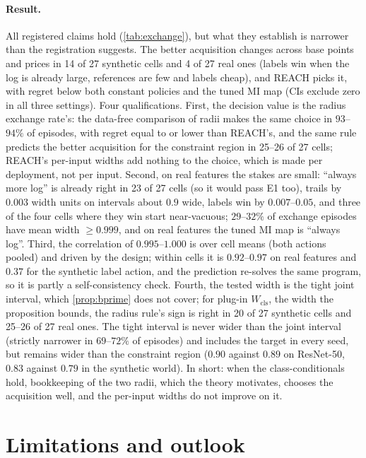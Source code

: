 \documentclass[twoside]{article}
\newcommand{\Wcls}{\ensuremath{W_{\mathrm{cls}}}}
\begin{document}
\paragraph{Result.} All registered claims hold (\cref{tab:exchange}), but what they establish is
narrower than the registration suggests. The better acquisition changes across base points and prices
in 14 of 27 synthetic cells and 4 of 27 real ones (labels win when the log is already large, references are
few and labels cheap), and REACH picks it, with regret below both constant policies and the tuned MI map
(CIs exclude zero in all three settings). Four qualifications. First, the decision value is the radius
exchange rate's: the data-free comparison of radii makes the same choice in $93$--$94\%$ of episodes,
with regret equal to or lower than REACH's, and the same rule predicts the better acquisition for
the constraint region in 25--26 of 27 cells; REACH's per-input widths add nothing to the choice, which is
made per deployment, not per input. Second, on real features the stakes are small: ``always more log'' is
already right in 23 of 27 cells (so it would pass E1 too), trails by $0.003$ width units on intervals about
$0.9$ wide, labels win by $0.007$--$0.05$, and three of the four cells where they win start near-vacuous;
$29$--$32\%$ of exchange episodes have mean width $\ge0.999$, and on real features the tuned MI map is
``always log''. Third, the correlation of $0.995$--$1.000$ is over cell means (both actions pooled) and driven by the
design; within cells it is $0.92$--$0.97$ on real features and $0.37$ for the synthetic label action, and the
prediction re-solves the same program, so it is partly a self-consistency check. Fourth, the tested width is the tight
joint interval, which \cref{prop:bprime} does not cover; for plug-in $\Wcls$, the width the proposition
bounds, the radius rule's sign is right in 20 of 27 synthetic cells and 25--26 of 27 real ones. The tight
interval is never wider than the joint interval (strictly narrower in $69$--$72\%$ of episodes) and includes
the target in every seed, but remains wider than the constraint region ($0.90$ against $0.89$ on ResNet-50,
$0.83$ against $0.79$ in the synthetic world). In short: when the class-conditionals hold, bookkeeping of
the two radii, which the theory motivates, chooses the acquisition well, and the per-input widths do not
improve on it.
\section{Limitations and outlook}
\label{sec:limitations}
\end{document}
